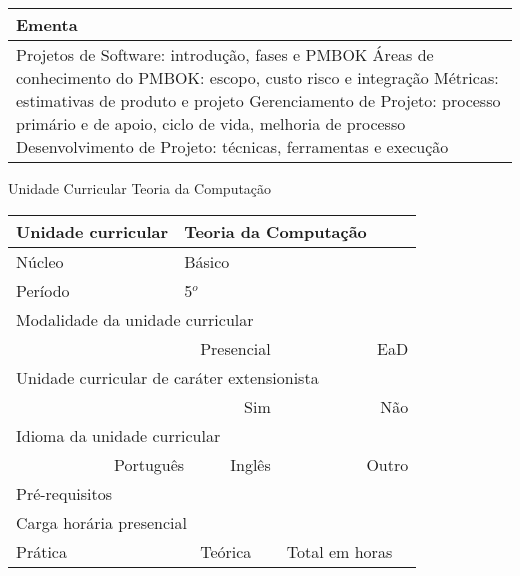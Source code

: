 \begin{quadro}[ht!]
\begin{tabular}{|p{3cm} p{2cm} p{3cm} p{2cm} p{3cm} p{2cm}|}
\multicolumn{6}{|p{15cm}|}{\cellcolor{blue1} Ementa} \\\hline
\hline\multicolumn{6}{|p{15cm}|}{\scriptsize Projetos de Software: introdução, fases e PMBOK Áreas de conhecimento do PMBOK: escopo, custo risco e integração Métricas: estimativas de produto e projeto Gerenciamento de Projeto: processo primário e de apoio, ciclo de vida, melhoria de processo Desenvolvimento de Projeto: técnicas, ferramentas e execução}\\\hline 
\hline
	\end{tabular}
\end{quadro}


\begin{quadro}[ht!]
  \centering\scriptsize
\caption{Unidade Curricular Teoria da Computação}
\begin{tabular}{|p{3cm} p{2cm} p{3cm} p{2cm} p{3cm} p{2cm}|}\hline
\multicolumn{1}{|p{3cm}|}{\cellcolor{blue1} Unidade curricular} & \multicolumn{5}{p{9cm}|}{Teoria da Computação}\\\hline
\multicolumn{1}{|p{3cm}|}{\cellcolor{blue1} Núcleo} & \multicolumn{5}{p{11.5cm}|}{Básico}\\\hline
\multicolumn{1}{|p{3cm}|}{\cellcolor{blue1} Período} & \multicolumn{5}{p{9cm}|}{5$^o$}\\\hline
\multicolumn{6}{|p{15cm}|}{\cellcolor{blue1} Modalidade da unidade curricular} \\\hline
\multicolumn{2}{|r}{		} &  \multicolumn{2}{r}{Presencial \XBox} & \multicolumn{2}{r|}{EaD \Square	} \\\hline
\multicolumn{6}{|p{15cm}|}{\cellcolor{blue1} Unidade curricular de caráter extensionista} \\\hline
\multicolumn{4}{|r}{			Sim \XBox	} & \multicolumn{2}{r|}{	Não \Square	}\\\hline
\multicolumn{6}{|p{15cm}|}{\cellcolor{blue1} Idioma da unidade curricular} \\ \hline
\multicolumn{2}{|r}{	Português \XBox	} &  \multicolumn{2}{r}{	Inglês \Square	} & \multicolumn{2}{r|}{	Outro \Square	} \\ \hline
\multicolumn{1}{|p{3cm}|}{\cellcolor{blue1} Pré-requisitos} & \multicolumn{5}{p{9cm}|}{}\\ \hline
\multicolumn{6}{|p{15cm}|}{\cellcolor{blue1} Carga horária presencial} \\ \hline
\multicolumn{1}{|p{3cm}|}{\raggedleft Prática} & \multicolumn{1}{p{1cm}|}{\centering	30	} &  \multicolumn{1}{p{3cm}|}{\raggedleft Teórica}  & \multicolumn{1}{p{1cm}|}{\centering 	30	} & \multicolumn{1}{p{3cm}|}{\raggedleft Total em horas} & \multicolumn{1}{p{1cm}|}{\raggedleft	60	} \\ \hline 

\end{tabular}
\end{quadro}
